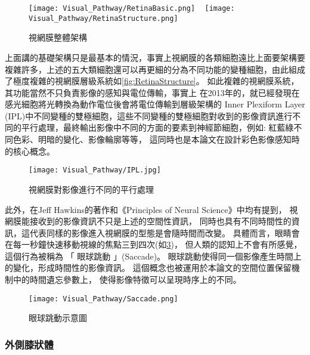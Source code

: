 \documentclass[class=NCU_thesis, crop=false]{standalone}
\begin{document}
\begin{figure}[H]
  \centering
    {\texttt{[image: Visual\_Pathway/RetinaBasic.png]}
    }
~
    {\texttt{[image: Visual\_Pathway/RetinaStructure.png]}
    }
  \caption{視網膜整體架構}
  \label{fig:RetinaTotalStructure}
\end{figure}

上面講的基礎架構只是最基本的情況，事實上視網膜的各類細胞遠比上面要架構要複雜許多，上述的五大類細胞還可以再更細的分為不同功能的變種細胞，由此組成了極度複雜的視網膜層級系統如\cref{fig:RetinaStructure}。
如此複雜的視網膜系統，其功能當然不只負責影像的感知與電位傳輸，事實上
在2013年的\cite{annurev}，就已經發現在感光細胞將光轉換為動作電位後會將電位傳輸到層級架構的 Inner Plexiform Layer (IPL)中不同變種的雙極細胞，這些不同變種的雙極細胞對收到的影像資訊進行不同的平行處理，最終輸出影像中不同的方面的要素到神經節細胞，例如: 紅藍綠不同色彩、明暗的變化、影像輪廓等等， 這同時也是本論文在設計彩色影像感知時的核心概念。

\begin{figure}[H]
  \centering
  \texttt{[image: Visual\_Pathway/IPL.jpg]}
  \caption{視網膜對影像進行不同的平行處理~\cite{annurev}}
  \label{fig:IPL}
\end{figure}
\pagebreak

此外，在Jeff Hawkins的著作\cite{10.5555993636}和《Principles of Neural Science》\cite{1180370208}中均有提到，
視網膜能接收到的影像資訊不只是上述的空間性資訊，
同時也具有不同時間性的資訊，這代表同樣的影像進入視網膜的型態是會隨時間而改變。
具體而言，眼睛會在每一秒鐘快速移動視線的焦點三到四次(如\cref{fig:Saccade})，
但人類的認知上不會有所感覺，這個行為被稱為 「 眼球跳動 」(Saccade)。
眼球跳動使得同一個影像產生時間上的變化，形成時間性的影像資訊。
這個概念也被運用於本論文的空間位置保留機制中的時間遺忘參數上，
使得影像特徵可以呈現時序上的不同。

\begin{figure}[H]
  \centering
  \texttt{[image: Visual\_Pathway/Saccade.png]}
  \caption{眼球跳動示意圖~\cite{annurev}}
  \label{fig:Saccade}
\end{figure}

\subsubsection{外側膝狀體}
\end{document}
